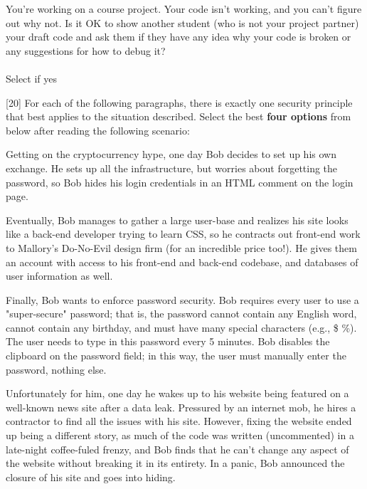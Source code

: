 \documentclass[12pt]{exam}
\newcommand{\includesolution}[1]{%
\IfFileExists{solutions/#1.tex}{%
\begin{solution}%
%
\end{solution}%
}{}
}
\newcommand{\checkbox}[3]{%
\ifprintanswers\else%
\CheckBox[name = #1, checked = #3, backgroundcolor=white, bordercolor=black, #2]{}%
\fi%
}
\begin{document}
\begin{Form}
\begin{questions}
You're working on a course project.
Your code isn't working, and you can't figure out why not.
Is it OK to show another student (who is not your project partner) your
draft code and ask them if they have any idea why your code is broken
or any suggestions for how to debug it?\\\\
Select if yes \checkbox{Q2Y}{}{
false}


\includesolution{sol2}

\newpage
[20]
For each of the following paragraphs, there is exactly one security principle that best applies to the situation described. Select the best \textbf{four options} from below after reading the following scenario:

Getting on the cryptocurrency hype, one day Bob decides to set up his own exchange. He
sets up all the infrastructure, but worries about forgetting the password, so Bob hides
his login credentials in an HTML comment on the login page.

Eventually, Bob manages to gather a large user-base and realizes his site looks like a
back-end developer trying to learn CSS, so he contracts out front-end work to Mallory's
Do-No-Evil design firm (for an incredible price too!). He gives them an account with access
to his front-end and back-end codebase, and databases of user information as well.

Finally, Bob wants to enforce password security. Bob requires every user to use a "super-secure" 
password; that is, the password cannot contain any English word, cannot contain any birthday, and 
must have many special characters (e.g., \$ \%). The user needs to type in this password every 5 minutes. 
Bob disables the clipboard on the password field; in this way, the user must manually enter the password, nothing else. 

Unfortunately for him, one day he wakes up to his website being
featured on a well-known news site after a data leak. Pressured by an
internet mob, he hires a contractor to find all the issues with his
site. However, fixing the website ended up being a different story,
as much of the code was written (uncommented) in a late-night
coffee-fuled frenzy, and Bob finds that he can't change any aspect of
the website without breaking it in its entirety.  In a panic, Bob
announced the closure of his site and goes into hiding.


\end{questions}
\end{Form}
\end{document}
